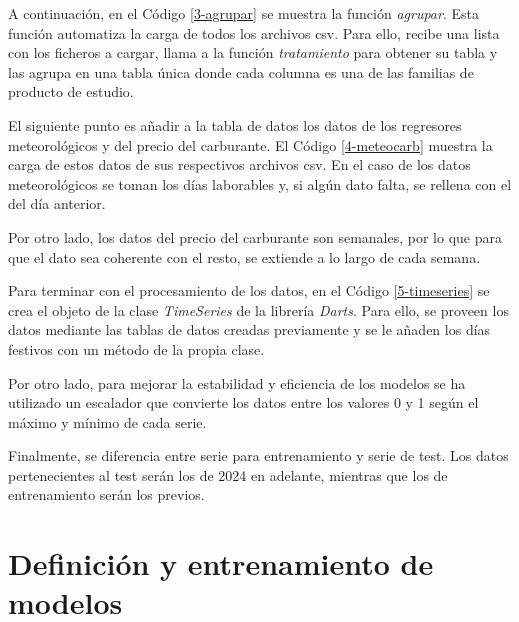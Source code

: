 

A continuación, en el Código \ref*{3-agrupar} se muestra la función \textit{agrupar}. Esta función automatiza la carga de todos los archivos csv. Para ello, recibe una lista con los ficheros a cargar, llama a la función \textit{tratamiento} para obtener su tabla y las agrupa en una tabla única donde cada columna es una de las familias de producto de estudio.



El siguiente punto es añadir a la tabla de datos los datos de los regresores meteorológicos y del precio del carburante. El Código \ref*{4-meteocarb} muestra la carga de estos datos de sus respectivos archivos csv. En el caso de los datos meteorológicos se toman los días laborables y, si algún dato falta, se rellena con el del día anterior.

Por otro lado, los datos del precio del carburante son semanales, por lo que para que el dato sea coherente con el resto, se extiende a lo largo de cada semana.



Para terminar con el procesamiento de los datos, en el Código \ref*{5-timeseries} se crea el objeto de la clase \textit{TimeSeries} de la librería \textit{Darts}. Para ello, se proveen los datos mediante las tablas de datos creadas previamente y se le añaden los días festivos con un método de la propia clase.

Por otro lado, para mejorar la estabilidad y eficiencia de los modelos se ha utilizado un escalador que convierte los datos entre los valores 0 y 1 según el máximo y mínimo de cada serie.

Finalmente, se diferencia entre serie para entrenamiento y serie de test. Los datos pertenecientes al test serán los de 2024 en adelante, mientras que los de entrenamiento serán los previos.




\section{Definición y entrenamiento de modelos}\label{cap4-entreno}

